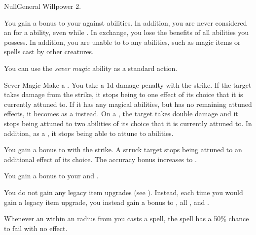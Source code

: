     \begin{feat}{Null}{General}
        \featpre Willpower 2.

         You gain a  bonus to your  against  abilities.
        In addition, you are never considered an  for a  ability, even while \unconscious.
        In exchange, you lose the benefits of all  abilities you possess.
        In addition, you are unable to  to any  abilities, such as magic items or spells cast by other creatures.

         You can use the \textit{sever magic} ability as a standard action.
        \begin{freeability}{Sever Magic}
            Make a .
            You take a \minus1d damage penalty with the strike.
            If the target takes damage from the strike, it stops being  to one effect of its choice that it is currently attuned to.
            If it has any magical abilities, but has no remaining attuned effects, it becomes \dazed as a  instead.
            On a , the target takes double damage and it stops being attuned to two abilities of its choice that it is currently attuned to.
            In addition, as a , it stops being able to attune to abilities.

            \rankline
             You gain a  bonus to  with the strike.
             A struck target stops being attuned to an additional effect of its choice.
             The accuracy bonus increases to .
        \end{freeability}

         You gain a  bonus to your  and .

         You do not gain any legacy item upgrades (see ).
        Instead, each time you would gain a legacy item upgrade, you instead gain a  bonus to , all , and .

         Whenever an  within an \areamed radius from you casts a spell, the spell has a 50\% chance to fail with no effect.


\end{feat}
